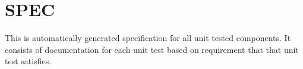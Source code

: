 \hypertarget{group__SPEC}{\section{S\+P\+E\+C}
\label{group__SPEC}
}
This is automatically generated specification for all unit tested components. It consists of documentation for each unit test based on requirement that that unit test satisfies. 
